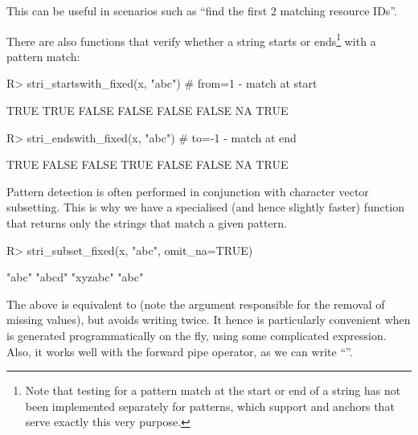 \documentclass[nojss]{jss}
\begin{document}
\noindent
This can be useful in scenarios such as ``find the first 2 matching
resource IDs''.


\medskip
There are also functions that verify whether a string
starts or ends\footnote{Note that testing for a pattern match at the start
or end of a string has not been implemented separately for  patterns,
which support  and  anchors that  serve exactly this very purpose.}
with a pattern match:

\begin{Schunk}
\begin{Sinput}
R> stri_startswith_fixed(x, "abc")  # from=1 - match at start
\end{Sinput}
\begin{Soutput}
[1]  TRUE  TRUE FALSE FALSE FALSE FALSE    NA  TRUE
\end{Soutput}
\begin{Sinput}
R> stri_endswith_fixed(x, "abc")    # to=-1 - match at end
\end{Sinput}
\begin{Soutput}
[1]  TRUE FALSE FALSE  TRUE FALSE FALSE    NA  TRUE
\end{Soutput}
\end{Schunk}


\medskip
Pattern detection is often performed in conjunction
with character vector subsetting.
This is why we have a specialised (and hence slightly faster)
function that  returns only the strings that match a given pattern.


\begin{Schunk}
\begin{Sinput}
R> stri_subset_fixed(x, "abc", omit_na=TRUE)
\end{Sinput}
\begin{Soutput}
[1] "abc"    "abcd"   "xyzabc" "abc"
\end{Soutput}
\end{Schunk}

The above is equivalent to 
(note the argument responsible for the removal of missing values),
but avoids writing  twice.
It hence is particularly convenient when  is generated
programmatically on the fly, using some complicated expression.
Also, it works well with the forward pipe operator, as we can write
``''.


\end{document}
